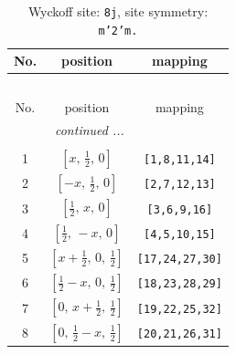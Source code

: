 \documentclass[fleqn,8pt]{jsarticle}
\begin{document}
\begin{longtable}{ccc}
\caption{Wyckoff site: {\tt 8j}, site symmetry: {\tt m'2'm.}}
 \\
 \hline \hline
No. & position & mapping \\ \hline \endfirsthead

\multicolumn{2}{l}{\tablename\ \thetable{}} \\
 \hline \hline
No. & position & mapping \\ \hline \endhead

 \hline \hline
\multicolumn{2}{r}{\footnotesize\it continued ...} \\ \endfoot

 \hline \hline
\multicolumn{2}{r}{} \\ \endlastfoot

1 & $\left[ x,\, \frac{1}{2},\, 0 \right]$ & {\tt [1,8,11,14]} \\ \hline
2 & $\left[ - x,\, \frac{1}{2},\, 0 \right]$ & {\tt [2,7,12,13]} \\ \hline
3 & $\left[ \frac{1}{2},\, x,\, 0 \right]$ & {\tt [3,6,9,16]} \\ \hline
4 & $\left[ \frac{1}{2},\, - x,\, 0 \right]$ & {\tt [4,5,10,15]} \\ \hline
5 & $\left[ x + \frac{1}{2},\, 0,\, \frac{1}{2} \right]$ & {\tt [17,24,27,30]} \\ \hline
6 & $\left[ \frac{1}{2} - x,\, 0,\, \frac{1}{2} \right]$ & {\tt [18,23,28,29]} \\ \hline
7 & $\left[ 0,\, x + \frac{1}{2},\, \frac{1}{2} \right]$ & {\tt [19,22,25,32]} \\ \hline
8 & $\left[ 0,\, \frac{1}{2} - x,\, \frac{1}{2} \right]$ & {\tt [20,21,26,31]} \\
\end{longtable}
\renewcommand{\arraystretch}{1.2}
\end{document}
